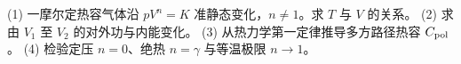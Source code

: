 (1) 一摩尔定热容气体沿 \(pV^n=K\) 准静态变化，\(n\ne1\)。求 \(T\) 与 \(V\) 的关系。
(2) 求由 \(V_1\) 至 \(V_2\) 的对外功与内能变化。
(3) 从热力学第一定律推导多方路径热容 \(C_{\rm pol}\)。
(4) 检验定压 \(n=0\)、绝热 \(n=\gamma\) 与等温极限 \(n\to1\)。
